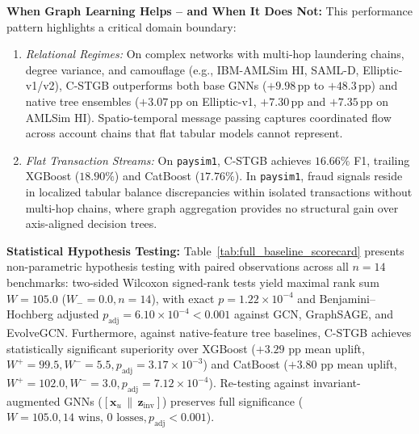 \textbf{When Graph Learning Helps -- and When It Does Not:} This performance pattern highlights a critical domain boundary:
\begin{enumerate}
    \item \textit{Relational Regimes:} On complex networks with multi-hop laundering chains, degree variance, and camouflage (e.g., IBM-AMLSim HI, SAML-D, Elliptic-v1/v2), C-STGB outperforms both base GNNs ($+9.98$\,pp to $+48.3$\,pp) and native tree ensembles ($+3.07$\,pp on Elliptic-v1, $+7.30$\,pp and $+7.35$\,pp on AMLSim HI). Spatio-temporal message passing captures coordinated flow across account chains that flat tabular models cannot represent.
    \item \textit{Flat Transaction Streams:} On \texttt{paysim1}, C-STGB achieves $16.66\%$ F1, trailing XGBoost ($18.90\%$) and CatBoost ($17.76\%$). In \texttt{paysim1}, fraud signals reside in localized tabular balance discrepancies within isolated transactions without multi-hop chains, where graph aggregation provides no structural gain over axis-aligned decision trees.
\end{enumerate}

\textbf{Statistical Hypothesis Testing:} Table~\ref{tab:full_baseline_scorecard} presents non-parametric hypothesis testing with paired observations across all $n=14$ benchmarks: two-sided Wilcoxon signed-rank tests yield maximal rank sum $W = 105.0$ ($W_- = 0.0, n=14$), with exact $p = 1.22 \times 10^{-4}$ and Benjamini--Hochberg adjusted $p_{\text{adj}} = 6.10 \times 10^{-4} < 0.001$ against GCN, GraphSAGE, and EvolveGCN. Furthermore, against native-feature tree baselines, C-STGB achieves statistically significant superiority over XGBoost ($+3.29\text{ pp}$ mean uplift, $W^+=99.5, W^-=5.5, p_{\text{adj}} = 3.17 \times 10^{-3}$) and CatBoost ($+3.80\text{ pp}$ mean uplift, $W^+=102.0, W^-=3.0, p_{\text{adj}} = 7.12 \times 10^{-4}$). Re-testing against invariant-augmented GNNs ($[\mathbf{x}_u \,\|\, \mathbf{z}_{\text{inv}}]$) preserves full significance ($W=105.0, 14\text{ wins, } 0\text{ losses}, p_{\text{adj}} < 0.001$).




